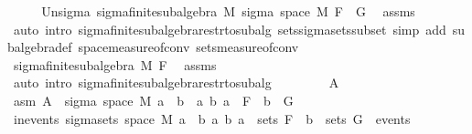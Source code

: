 \begin{isabellebody}
%
\endisadelimproof
%
\isatagproof
{}\isamarkupfalse%
\ {\isacharminus}{\kern0pt}\isanewline
\ \ \isamarkupfalse%
\ Un{\isacharunderscore}{\kern0pt}sigma{\isacharcolon}{\kern0pt}\ sigma{\isacharunderscore}{\kern0pt}finite{\isacharunderscore}{\kern0pt}subalgebra\ M\ {\isachardoublequoteopen}sigma\ {\isacharparenleft}{\kern0pt}space\ M{\isacharparenright}{\kern0pt}\ {\isacharparenleft}{\kern0pt}F\ {\isasymunion}\ G{\isacharparenright}{\kern0pt}{\isachardoublequoteclose}\ \isamarkupfalse%
\ assms{\isacharparenleft}{\kern0pt}{}{\isacharcomma}{\kern0pt}{}{\isacharparenright}{\kern0pt}\ \isamarkupfalse%
\ {\isacharparenleft}{\kern0pt}auto\ intro{\isacharbang}{\kern0pt}{\isacharcolon}{\kern0pt}\ sigma{\isacharunderscore}{\kern0pt}finite{\isacharunderscore}{\kern0pt}subalgebra{\isacharunderscore}{\kern0pt}restr{\isacharunderscore}{\kern0pt}to{\isacharunderscore}{\kern0pt}subalg\ sets{\isachardot}{\kern0pt}sigma{\isacharunderscore}{\kern0pt}sets{\isacharunderscore}{\kern0pt}subset\ simp\ add{\isacharcolon}{\kern0pt}\ subalgebra{\isacharunderscore}{\kern0pt}def\ space{\isacharunderscore}{\kern0pt}measure{\isacharunderscore}{\kern0pt}of{\isacharunderscore}{\kern0pt}conv\ sets{\isacharunderscore}{\kern0pt}measure{\isacharunderscore}{\kern0pt}of{\isacharunderscore}{\kern0pt}conv{\isacharparenright}{\kern0pt}\isanewline
\ \ \isamarkupfalse%
\ sigma{\isacharunderscore}{\kern0pt}finite{\isacharunderscore}{\kern0pt}subalgebra\ M\ F\ \isamarkupfalse%
\ assms\ \isamarkupfalse%
\ {\isacharparenleft}{\kern0pt}auto\ intro{\isacharcolon}{\kern0pt}\ sigma{\isacharunderscore}{\kern0pt}finite{\isacharunderscore}{\kern0pt}subalgebra{\isacharunderscore}{\kern0pt}restr{\isacharunderscore}{\kern0pt}to{\isacharunderscore}{\kern0pt}subalg{\isacharparenright}{\kern0pt}\isanewline
\ \ \isacommand{{\isacharbraceleft}{\kern0pt}}\isamarkupfalse%
\isanewline
\ \ \ \ \isamarkupfalse%
\ A\isanewline
\ \ \ \ \isamarkupfalse%
\ asm{\isacharcolon}{\kern0pt}\ {\isachardoublequoteopen}A\ {\isasymin}\ sigma\ {\isacharparenleft}{\kern0pt}space\ M{\isacharparenright}{\kern0pt}\ {\isacharbraceleft}{\kern0pt}a\ {\isasyminter}\ b\ {\isacharbar}{\kern0pt}\ a\ b{\isachardot}{\kern0pt}\ a\ {\isasymin}\ F\ {\isasymand}\ b\ {\isasymin}\ G{\isacharbraceright}{\kern0pt}{\isachardoublequoteclose}\isanewline
\ \ \ \ \isamarkupfalse%
\ in{\isacharunderscore}{\kern0pt}events{\isacharcolon}{\kern0pt}\ {\isachardoublequoteopen}sigma{\isacharunderscore}{\kern0pt}sets\ {\isacharparenleft}{\kern0pt}space\ M{\isacharparenright}{\kern0pt}\ {\isacharbraceleft}{\kern0pt}a\ {\isasyminter}\ b\ {\isacharbar}{\kern0pt}a\ b{\isachardot}{\kern0pt}\ a\ {\isasymin}\ sets\ F\ {\isasymand}\ b\ {\isasymin}\ sets\ G{\isacharbraceright}{\kern0pt}\ {\isasymsubseteq}\ events{\isachardoublequoteclose}\ \isamarkupfalse%

\end{isabellebody}
